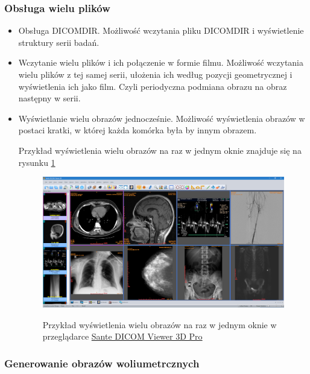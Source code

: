 \subsubsection{Obsługa wielu plików}

\begin{itemize}

      \item Obsługa DICOMDIR.
            Możliwość wczytania pliku DICOMDIR i wyświetlenie struktury serii badań.

      \item Wczytanie wielu plików i ich połączenie w formie filmu.
            Możliwość wczytania wielu plików z tej samej serii, ułożenia ich według pozycji geometrycznej i wyświetlenia ich jako film.
            Czyli periodyczna podmiana obrazu na obraz następny w serii.

      \item Wyświetlanie wielu obrazów jednocześnie.
            Możliwość wyświetlenia obrazów w postaci kratki, w której każda komórka była by innym obrazem.

            Przykład wyświetlenia wielu obrazów na raz w jednym oknie znajduje się na rysunku \ref{fig:dicomviewer001}

            \begin{figure}[!htbp]
                  \caption{Przykład wyświetlenia wielu obrazów na raz w jednym oknie w przeglądarce \href{https://www.santesoft.com/win/sante-dicom-viewer-3d-pro/sante-dicom-viewer-3d-pro.html}{Sante DICOM Viewer 3D Pro}}
                  \includegraphics[width=\textwidth]{img/dicom-viewer-001.png}
                  \centering
                  \label{fig:dicomviewer001}
            \end{figure}
\end{itemize}

\subsubsection{Generowanie obrazów woliumetrcznych}

